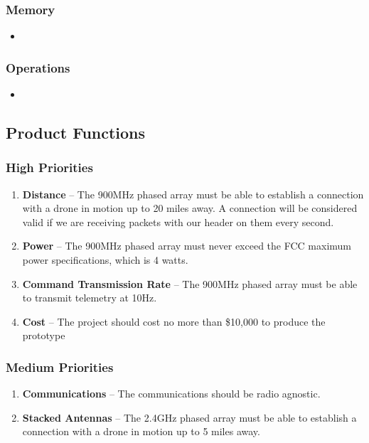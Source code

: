 \documentclass[ProjectRequirements.tex]{subfiles}
\begin{document}
		\subsubsection{Memory}
			\begin{itemize}\itemsep1pt
				\item 
			\end{itemize}
		
		\subsubsection{Operations}
			\begin{itemize}\itemsep1pt
				\item 
			\end{itemize}
		
	\subsection{Product Functions}
	
		\subsubsection{High Priorities}
			\begin{enumerate}
				\item \textbf{Distance} -- The 900MHz phased array must be able to establish a connection with a drone in motion up to 20 miles away. A connection will be considered valid if we are receiving packets with our header on them every second.
				\item \textbf{Power} -- The 900MHz phased array must never exceed the FCC maximum power specifications, which is 4 watts.
				\item \textbf{Command Transmission Rate} -- The 900MHz phased array must be able to transmit telemetry at 10Hz.
				\item \textbf{Cost} -- The project should cost no more than \$10,000 to produce the prototype
							
			\end{enumerate}
		
		\subsubsection{Medium Priorities}
			\begin{enumerate}
				\item \textbf{Communications} -- The communications should be radio agnostic.
				\item \textbf{Stacked Antennas} -- The 2.4GHz phased array must be able to establish a connection with a drone in motion up to 5 miles away.
			\end{enumerate}
		
\end{document}
